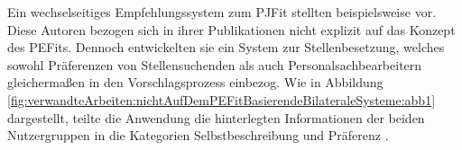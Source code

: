 Ein wechselseitiges Empfehlungssystem zum \ac{PJFit} stellten beispielsweise \textcite[S. 1ff.]{wenxing:2015} vor. Diese Autoren bezogen sich in ihrer Publikationen nicht explizit auf das Konzept des \acp{PEFit}. Dennoch entwickelten sie ein System zur Stellenbesetzung, welches sowohl Präferenzen von Stellensuchenden als auch Personalsachbearbeitern gleichermaßen in den Vorschlagsprozess einbezog. Wie in Abbildung \ref{fig:verwandteArbeiten:nichtAufDemPEFitBasierendeBilateraleSysteme:abb1} dargestellt, teilte die Anwendung die hinterlegten Informationen der beiden Nutzergruppen in die Kategorien Selbstbeschreibung und Präferenz \cite[S. 2]{wenxing:2015}.

